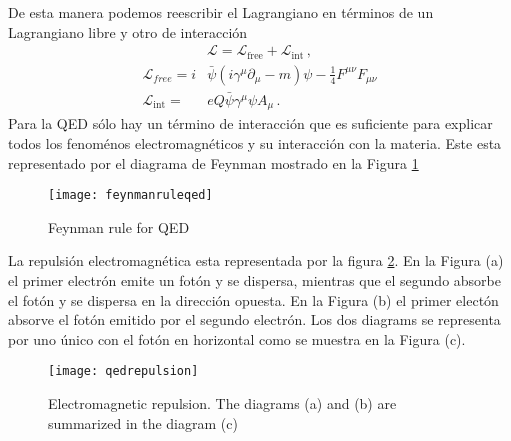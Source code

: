 \begin{frame}
De esta manera podemos reescribir el Lagrangiano en términos de un Lagrangiano libre y otro de interacción
\begin{align}
  \mathcal{L}=\mathcal{L}_{\text{free}}+\mathcal{L}_{\text{int}}\,,
\end{align}
\begin{align}
  \mathcal{L}_{free}=i&\bar{\psi}\left(i\gamma^\mu\partial_\mu-m\right)\psi-\tfrac{1}{4}F^{\mu\nu}F_{\mu\nu}\nonumber\\
  \mathcal{L}_{\text{int}}=&eQ\bar{\psi}\gamma^\mu\psi A_\mu\,.
\end{align}
Para la QED sólo hay un término de interacción que es suficiente para explicar todos los fenoménos electromagnéticos y su interacción con la materia. Este esta representado por el diagrama de Feynman mostrado en la Figura \ref{fig:feynmanruleqed}

\begin{figure}
  \texttt{[image: feynmanruleqed]} %
  \caption{Feynman rule for QED}
  \label{fig:feynmanruleqed}
\end{figure}

La repulsión electromagnética esta representada por la figura \ref{fig:qedrepulsion}. En la Figura (a) el primer electrón emite un fotón y se dispersa, mientras que el segundo absorbe el fotón y se dispersa en la dirección opuesta. En la Figura (b) el primer electón absorve el fotón emitido por el segundo electrón. Los dos diagrams se representa por uno único con el fotón en horizontal como se muestra en la Figura (c).

\begin{figure}
  \centering
  \texttt{[image: qedrepulsion]}
  \caption{Electromagnetic repulsion. The diagrams (a) and (b) are summarized in the diagram (c)}
  \label{fig:qedrepulsion}
\end{figure}
\end{frame}


